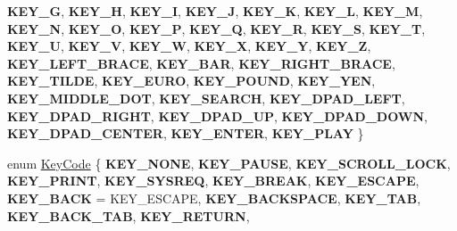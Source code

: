 \begin{DoxyCompactItemize}
{\bfseries K\+E\+Y\+\_\+G}, 
{\bfseries K\+E\+Y\+\_\+H}, 
{\bfseries K\+E\+Y\+\_\+I}, 
{\bfseries K\+E\+Y\+\_\+J}, 
\newline
{\bfseries K\+E\+Y\+\_\+K}, 
{\bfseries K\+E\+Y\+\_\+L}, 
{\bfseries K\+E\+Y\+\_\+M}, 
{\bfseries K\+E\+Y\+\_\+N}, 
\newline
{\bfseries K\+E\+Y\+\_\+O}, 
{\bfseries K\+E\+Y\+\_\+P}, 
{\bfseries K\+E\+Y\+\_\+Q}, 
{\bfseries K\+E\+Y\+\_\+R}, 
\newline
{\bfseries K\+E\+Y\+\_\+S}, 
{\bfseries K\+E\+Y\+\_\+T}, 
{\bfseries K\+E\+Y\+\_\+U}, 
{\bfseries K\+E\+Y\+\_\+V}, 
\newline
{\bfseries K\+E\+Y\+\_\+W}, 
{\bfseries K\+E\+Y\+\_\+X}, 
{\bfseries K\+E\+Y\+\_\+Y}, 
{\bfseries K\+E\+Y\+\_\+Z}, 
\newline
{\bfseries K\+E\+Y\+\_\+\+L\+E\+F\+T\+\_\+\+B\+R\+A\+CE}, 
{\bfseries K\+E\+Y\+\_\+\+B\+AR}, 
{\bfseries K\+E\+Y\+\_\+\+R\+I\+G\+H\+T\+\_\+\+B\+R\+A\+CE}, 
{\bfseries K\+E\+Y\+\_\+\+T\+I\+L\+DE}, 
\newline
{\bfseries K\+E\+Y\+\_\+\+E\+U\+RO}, 
{\bfseries K\+E\+Y\+\_\+\+P\+O\+U\+ND}, 
{\bfseries K\+E\+Y\+\_\+\+Y\+EN}, 
{\bfseries K\+E\+Y\+\_\+\+M\+I\+D\+D\+L\+E\+\_\+\+D\+OT}, 
\newline
{\bfseries K\+E\+Y\+\_\+\+S\+E\+A\+R\+CH}, 
{\bfseries K\+E\+Y\+\_\+\+D\+P\+A\+D\+\_\+\+L\+E\+FT}, 
{\bfseries K\+E\+Y\+\_\+\+D\+P\+A\+D\+\_\+\+R\+I\+G\+HT}, 
{\bfseries K\+E\+Y\+\_\+\+D\+P\+A\+D\+\_\+\+UP}, 
\newline
{\bfseries K\+E\+Y\+\_\+\+D\+P\+A\+D\+\_\+\+D\+O\+WN}, 
{\bfseries K\+E\+Y\+\_\+\+D\+P\+A\+D\+\_\+\+C\+E\+N\+T\+ER}, 
{\bfseries K\+E\+Y\+\_\+\+E\+N\+T\+ER}, 
{\bfseries K\+E\+Y\+\_\+\+P\+L\+AY}
 \}
\item 
enum \hyperlink{classEventKeyboard_a7cd3fa46515673276ce8ec7f0e051606}{Key\+Code} \{ \newline
{\bfseries K\+E\+Y\+\_\+\+N\+O\+NE}, 
{\bfseries K\+E\+Y\+\_\+\+P\+A\+U\+SE}, 
{\bfseries K\+E\+Y\+\_\+\+S\+C\+R\+O\+L\+L\+\_\+\+L\+O\+CK}, 
{\bfseries K\+E\+Y\+\_\+\+P\+R\+I\+NT}, 
\newline
{\bfseries K\+E\+Y\+\_\+\+S\+Y\+S\+R\+EQ}, 
{\bfseries K\+E\+Y\+\_\+\+B\+R\+E\+AK}, 
{\bfseries K\+E\+Y\+\_\+\+E\+S\+C\+A\+PE}, 
{\bfseries K\+E\+Y\+\_\+\+B\+A\+CK} = K\+E\+Y\+\_\+\+E\+S\+C\+A\+PE, 
\newline
{\bfseries K\+E\+Y\+\_\+\+B\+A\+C\+K\+S\+P\+A\+CE}, 
{\bfseries K\+E\+Y\+\_\+\+T\+AB}, 
{\bfseries K\+E\+Y\+\_\+\+B\+A\+C\+K\+\_\+\+T\+AB}, 
{\bfseries K\+E\+Y\+\_\+\+R\+E\+T\+U\+RN}, 
\newline

\end{DoxyCompactItemize}
